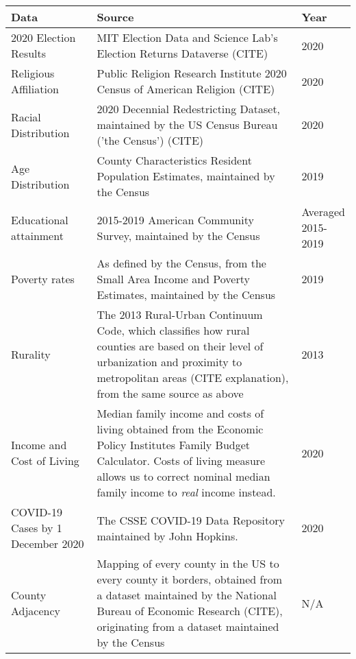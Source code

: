 \begin{minipage}{6.5in}
	\centering
	\def\sym#1{\ifmmode^{#1}\else\(^{#1}\)\fi}
	\def\arraystretch{1.1}
	\small
	\begin{tabular*}{\textwidth}{@{\extracolsep{\fill}}p{0.25\linewidth}p{0.6\linewidth}p{0.15\linewidth}}
		\hline\hline
		Data&Source&Year\\
		\hline
		2020 Election Results&MIT Election Data and Science Lab's Election Returns Dataverse (CITE)&2020\\
		Religious Affiliation&Public Religion Research Institute 2020 Census of American Religion (CITE)&2020\\
		Racial Distribution&2020 Decennial Redestricting Dataset, maintained by the US Census Bureau ('the Census') (CITE)&2020\\
		Age Distribution&County Characteristics Resident Population Estimates, maintained by the Census&2019\\
		Educational attainment&2015-2019 American Community Survey, maintained by the Census& Averaged 2015-2019\\
		Poverty rates&As defined by the Census, from the Small Area Income and Poverty Estimates, maintained by the Census&2019\\
		Rurality&The 2013 Rural-Urban Continuum Code, which classifies how rural counties are based on their level of urbanization and proximity to metropolitan areas (CITE explanation), from the same source as above&2013\\
		Income and Cost of Living&Median family income and costs of living obtained from the Economic Policy Institutes Family Budget Calculator. Costs of living measure allows us to correct nominal median family income to \textit{real} income instead.&2020\\
		COVID-19 Cases by 1 December 2020&The CSSE COVID-19 Data Repository maintained by John Hopkins.&2020\\
		County Adjacency&Mapping of every county in the US to every county it borders, obtained from a dataset maintained by the National Bureau of Economic Research (CITE), originating from a dataset maintained by the Census&N/A\\
		\hline\hline
	\end{tabular*}

\end{minipage}
